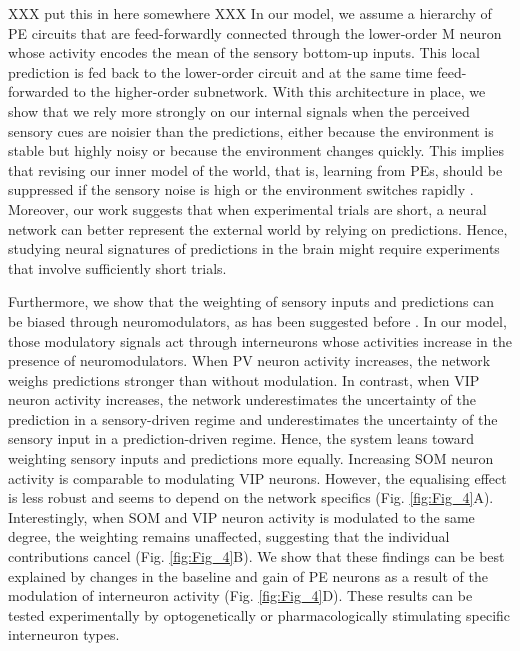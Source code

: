 \documentclass[10pt,a4paper,draft]{article}
\begin{document}
XXX put this in here somewhere XXX
In our model, we assume a hierarchy of PE circuits that are feed-forwardly connected through the lower-order M neuron whose activity encodes the mean of the sensory bottom-up inputs. This local prediction is fed back to the lower-order circuit and at the same time feed-forwarded to the higher-order subnetwork. With this architecture in place, we show that we rely more strongly on our internal signals when the perceived sensory cues are noisier than the predictions, either because the environment is stable but highly noisy or because the environment changes quickly. This implies that revising our inner model of the world, that is, learning from PEs, should be suppressed if the sensory noise is high or the environment switches rapidly \citep{herzfeld2014memory}. Moreover, our work suggests that when experimental trials are short, a neural network can better represent the external world by relying on predictions. Hence, studying neural signatures of predictions in the brain might require experiments that involve sufficiently short trials.

Furthermore, we show that the weighting of sensory inputs and predictions can be biased through neuromodulators, as has been suggested before \citep{XXX}. In our model, those modulatory signals act through interneurons \citep{cardin2019functional} whose activities increase in the presence of neuromodulators. When PV neuron activity increases, the network weighs predictions stronger than without modulation. In contrast, when VIP neuron activity increases, the network underestimates the uncertainty of the prediction in a sensory-driven regime and underestimates the uncertainty of the sensory input in a prediction-driven regime. Hence, the system leans toward weighting sensory inputs and predictions more equally. Increasing SOM neuron activity is comparable to modulating VIP neurons. However, the equalising effect is less robust and seems to depend on the network specifics (Fig. \ref{fig:Fig_4}A). Interestingly, when SOM and VIP neuron activity is modulated to the same degree, the weighting remains unaffected, suggesting that the individual contributions cancel (Fig. \ref{fig:Fig_4}B). We show that these findings can be best explained by changes in the baseline and gain of PE neurons as a result of the modulation of interneuron activity (Fig. \ref{fig:Fig_4}D). These results can be tested experimentally by optogenetically or pharmacologically stimulating specific interneuron types.  
\end{document}
